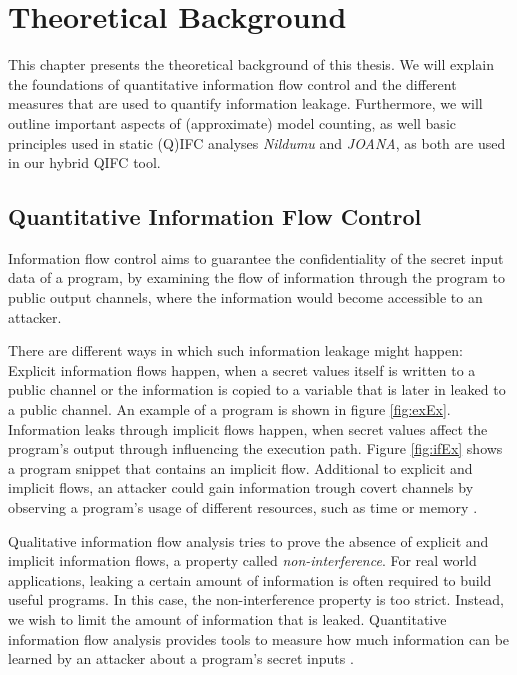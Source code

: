 \chapter{Theoretical Background}\label{sec:basics}

This chapter presents the theoretical background of this thesis. We will explain the foundations of quantitative information flow control and the different measures that are used to quantify information leakage. Furthermore, we will outline important aspects of (approximate) model counting, as well basic principles used in static (Q)IFC analyses \emph{Nildumu} and \emph{JOANA}, as both are used in our hybrid QIFC tool.

\section{Quantitative Information Flow Control}

Information flow control aims to guarantee the confidentiality of the secret input data of a program, by examining the flow of information through the program to public output channels, where the information would become accessible to an attacker.

There are different ways in which such information leakage might happen: Explicit information flows happen, when a secret values itself is written to a public channel or the information is copied to a variable that is later in leaked to a public channel. An example of a program is shown in figure \ref{fig:exEx}. Information leaks through implicit flows happen, when secret values affect the program's output through influencing the execution path. Figure \ref{fig:ifEx} shows a program snippet that contains an implicit flow. Additional to explicit and implicit flows, an attacker could gain information trough covert channels by observing a program's usage of different resources, such as time or memory \cite{smith07}.

Qualitative information flow analysis tries to prove the absence of explicit and implicit information flows, a property called \emph{non-interference}. For real world applications, leaking a certain amount of information is often required to build useful programs. In this case, the non-interference property is too strict. Instead, we wish to limit the amount of information that is leaked. Quantitative information flow analysis provides tools to measure how much information can be learned by an attacker about a program's secret inputs \cite{smith09}.

